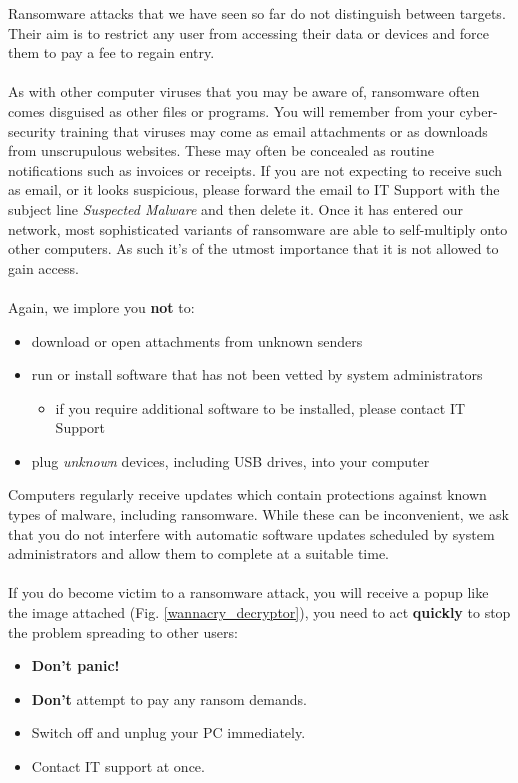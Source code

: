 \documentclass{article}
\begin{document}
Ransomware attacks that we have seen so far do not distinguish between targets. Their aim is to restrict any user from accessing their data or devices and force them to pay a fee to regain entry.
\\\\
As with other computer viruses that you may be aware of, ransomware often comes disguised as other files or programs. You will remember from your cyber-security training that viruses may come as email attachments or as downloads from unscrupulous websites. These may often be concealed as routine notifications such as invoices or receipts. If you are not expecting to receive such as email, or it looks suspicious, please forward the email to IT Support with the subject line \textit{Suspected Malware} and then delete it. Once it has entered our network, most sophisticated variants of ransomware are able to self-multiply onto other computers. As such it's of the utmost importance that it is not allowed to gain access.
\\\\
Again, we implore you \textbf{not} to:
\begin{itemize}
	\item download or open attachments from unknown senders
	\item run or install software that has not been vetted by system administrators
		\begin{itemize}
			\item if you require additional software to be installed, please contact IT Support
		\end{itemize}
	\item plug \textit{unknown} devices, including USB drives, into your computer
\end{itemize}

Computers regularly receive updates which contain protections against known types of malware, including ransomware.
While these can be inconvenient, we ask that you do not interfere with automatic software updates scheduled by system administrators and allow them to complete at a suitable time.
\\\\
If you do become victim to a ransomware attack, you will receive a popup like the image attached (Fig. \ref{wannacry_decryptor}), you need to act \textbf{quickly} to stop the problem spreading to other users:
\begin{itemize}
	\item \textbf{Don't panic!}
	\item \textbf{Don't} attempt to pay any ransom demands.
	\item Switch off and unplug your PC immediately.
	\item Contact IT support at once.
\end{itemize}
\end{document}
